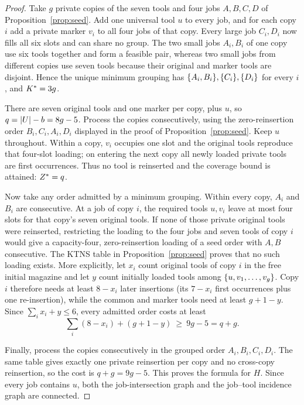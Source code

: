 \begin{proof}
Take $g$ private copies of the seven tools and four jobs $A,B,C,D$ of
Proposition~\ref{prop:seed}. Add one universal tool $u$ to every job, and for each
copy $i$ add a private marker $v_i$ to all four jobs of that copy. Every large job
$C_i,D_i$ now fills all six slots and can share no group. The two small jobs
$A_i,B_i$ of one copy use six tools together and form a feasible pair, whereas two
small jobs from different copies use seven tools because their original and marker
tools are disjoint. Hence the unique minimum grouping has
$\{A_i,B_i\},\{C_i\},\{D_i\}$ for every $i$, and $K^{\ast}=3g$.

There are seven original tools and one marker per copy, plus $u$, so
$q=\lvert U\rvert-b=8g-5$. Process the copies consecutively, using the
zero-reinsertion order $B_i,C_i,A_i,D_i$ displayed in the proof of
Proposition~\ref{prop:seed}. Keep $u$ throughout. Within a copy, $v_i$ occupies one
slot and the original tools reproduce that four-slot loading; on entering the next
copy all newly loaded private tools are first occurrences. Thus no tool is
reinserted and the coverage bound is attained: $Z^{\ast}=q$.

Now take any order admitted by a minimum grouping. Within every copy, $A_i$ and
$B_i$ are consecutive. At a job of copy $i$, the required tools $u,v_i$ leave at
most four slots for that copy's seven original tools. If none of those private
original tools were reinserted, restricting the loading to the four jobs and seven
tools of copy $i$ would give a capacity-four, zero-reinsertion loading of a seed
order with $A,B$ consecutive. The KTNS table in Proposition~\ref{prop:seed} proves
that no such loading exists. More explicitly, let $x_i$ count original tools of
copy $i$ in the free initial magazine and let $y$ count initially loaded tools among
$\{u,v_1,\ldots,v_g\}$. Copy $i$ therefore needs at least $8-x_i$ later
insertions (its $7-x_i$ first occurrences plus one re-insertion), while the common
and marker tools need at least $g+1-y$. Since $\sum_i x_i+y\le6$, every admitted
order costs at least
\[
  \sum_i(8-x_i)+(g+1-y)\ \ge\ 9g-5=q+g.
\]

Finally, process the copies consecutively in the grouped order $A_i,B_i,C_i,D_i$.
The same table gives exactly one private reinsertion per copy and no cross-copy
reinsertion, so the cost is $q+g=9g-5$. This proves the formula for $H$. Since every
job contains $u$, both the job-intersection graph and the job--tool incidence graph
are connected.
\end{proof}


